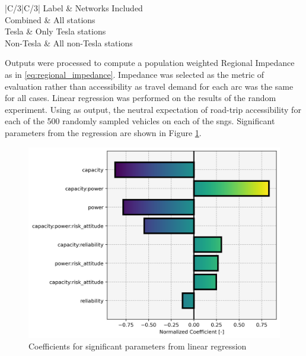 \begin{multicols}{2}
\begin{table}[H]
	\centering
	\caption{\glspl{sng} used in experiment.}
	\label{tab:experimental_sngs}
	\begin{tabular}{|C{\linewidth/3}|C{/3}|}
		\hline Label & Networks Included \\
		\hline Combined & All stations \\
		\hline Tesla & Only Tesla stations \\
		\hline Non-Tesla & All non-Tesla stations \\
		\hline
	\end{tabular}
\end{table}

Outputs were processed to compute a population weighted Regional Impedance as in \eqref{eq:regional_impedance}. Impedance was selected as the metric of evaluation rather than accessibility as travel demand for each arc was the same for all cases. Linear regression was performed on the results of the random experiment. Using as output, the neutral expectation of road-trip accessibility for each of the 500 randomly sampled vehicles on each of the \glspl{sng}. Significant parameters from the regression are shown in Figure \ref{fig:significant_parameters}.

\begin{figure}[H]
	\centering
	\includegraphics[width = \linewidth]{figs/significant_parameters.png}
	\caption{Coefficients for significant parameters from linear regression}
	\label{fig:significant_parameters}
\end{figure}


\end{multicols}
